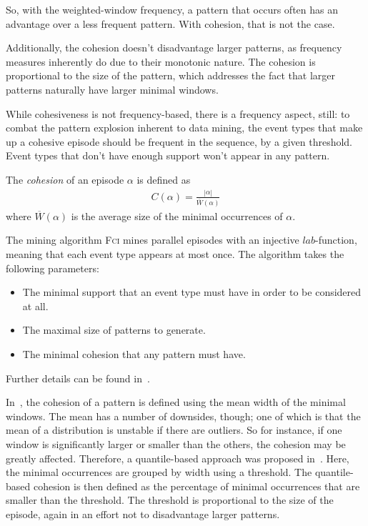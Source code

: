 So, with the weighted-window frequency, a pattern that occurs often has an advantage over a less frequent pattern. With cohesion, that is not the case.

Additionally, the cohesion doesn't disadvantage larger patterns, as frequency measures inherently do due to their monotonic nature. The cohesion is proportional to the size of the pattern, which addresses the fact that larger patterns naturally have larger minimal windows.

While cohesiveness is not frequency-based, there is a frequency aspect, still: to combat the pattern explosion inherent to data mining, the event types that make up a cohesive episode should be frequent in the sequence, by a given threshold. Event types that don't have enough support won't appear in any pattern.

The \emph{cohesion} of an episode $ \alpha $ is defined as
\begin{align*}
C(\alpha) = \frac{| \alpha |}{\overline{W}(\alpha)}
\end{align*}
where $ \overline{W}(\alpha) $ is the average size of the minimal occurrences of $ \alpha $.

The mining algorithm \textsc{Fci} mines parallel episodes with an injective $ lab $-function, meaning that each event type appears at most once. The algorithm takes the following parameters:
\begin{itemize}
\item The minimal support that an event type must have in order to be considered at all.
\item The maximal size of patterns to generate.
\item The minimal cohesion that any pattern must have.
\end{itemize}
Further details can be found in~\cite{cule2016efficient}.

In~\cite{cule2016efficient}, the cohesion of a pattern is defined using the mean width of the minimal windows. The mean has a number of downsides, though; one of which is that the mean of a distribution is unstable if there are outliers. So for instance, if one window is significantly larger or smaller than the others, the cohesion may be greatly affected. Therefore, a quantile-based approach was proposed in~\citep{feremans2018mining}. Here, the minimal occurrences are grouped by width using a threshold. The quantile-based cohesion is then defined as the percentage of minimal occurrences that are smaller than the threshold. The threshold is proportional to the size of the episode, again in an effort not to disadvantage larger patterns.

